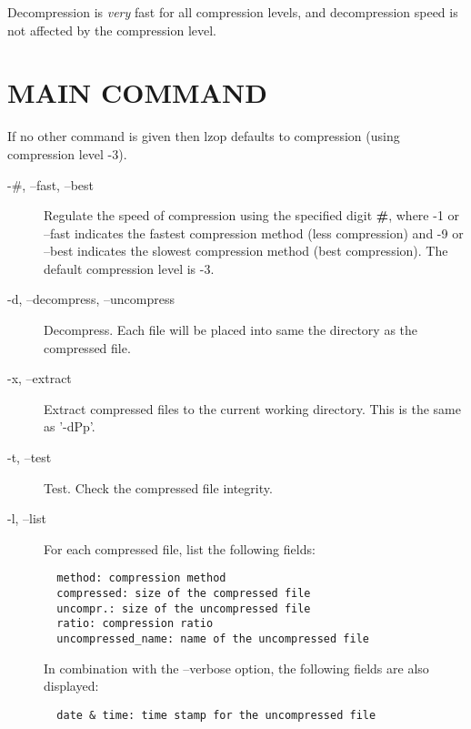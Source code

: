 Decompression is \textit{very} fast for all compression levels,
and decompression speed is not affected by the compression
level.

\section{MAIN COMMAND\label{MAIN_COMMAND}}


If no other command is given then lzop defaults to compression
(using compression level -3).

\begin{description}

\item[{-\#, --fast, --best}] \mbox{}

Regulate the speed of compression using the specified
digit \textbf{\#}, where -1 or --fast indicates the
fastest compression method (less compression) and
-9 or --best indicates the slowest compression
method (best compression). The default compression
level is -3.


\item[{-d, --decompress, --uncompress}] \mbox{}

Decompress. Each file will be placed into
same the directory as the compressed file.


\item[{-x, --extract}] \mbox{}

Extract compressed files to the current working
directory. This is the same as '-dPp'.


\item[{-t, --test}] \mbox{}

Test. Check the compressed file integrity.


\item[{-l, --list}] \mbox{}

For each compressed file, list the following
fields:

\begin{verbatim}
  method: compression method
  compressed: size of the compressed file
  uncompr.: size of the uncompressed file
  ratio: compression ratio
  uncompressed_name: name of the uncompressed file
\end{verbatim}


In combination with the --verbose option, the following
fields are also displayed:

\begin{verbatim}
  date & time: time stamp for the uncompressed file
\end{verbatim}



\end{description}
